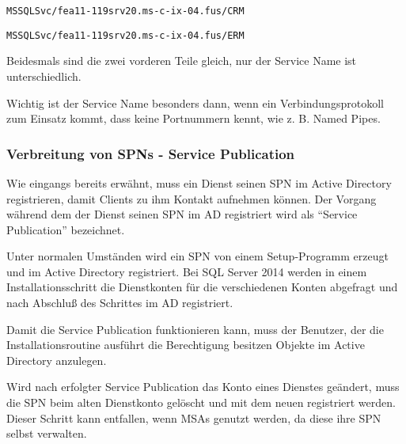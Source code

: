          \texttt{MSSQLSvc/fea11-119srv20.ms-c-ix-04.fus/CRM}
          
          \texttt{MSSQLSvc/fea11-119srv20.ms-c-ix-04.fus/ERM}
          
          Beidesmals sind die zwei vorderen Teile gleich, nur der Service
          Name ist unterschiedlich.
          \begin{merke}
            Wichtig ist der Service Name besonders dann, wenn ein
            Verbindungsprotokoll zum Einsatz kommt, dass keine Portnummern kennt,
            wie z. B. Named Pipes.
          \end{merke}
          \begin{literaturinternet}
            \item \cite{ms677601}
            \item \cite{qzaidi20101012}
          \end{literaturinternet}
        \subsubsection{Verbreitung von SPNs - Service Publication}
          Wie eingangs bereits erwähnt, muss ein Dienst seinen SPN im Active
          Directory registrieren, damit Clients zu ihm Kontakt aufnehmen können.
          Der Vorgang während dem der Dienst seinen SPN im AD registriert wird
          als \enquote{Service Publication} bezeichnet.

          Unter normalen Umständen wird ein SPN von einem Setup-Programm erzeugt
          und im Active Directory registriert. Bei SQL Server 2014 werden in einem
          Installationsschritt die Dienstkonten für die verschiedenen Konten
          abgefragt und nach Abschluß des Schrittes im AD registriert.
          \begin{merke}
            Damit die Service Publication funktionieren kann, muss der Benutzer,
            der die Installationsroutine ausführt die Berechtigung besitzen
            Objekte im Active Directory anzulegen.
          \end{merke}
          Wird nach erfolgter Service Publication das Konto eines Dienstes
          geändert, muss die SPN beim alten Dienstkonto gelöscht und mit dem neuen
          registriert werden. Dieser Schritt kann entfallen, wenn MSAs genutzt
          werden, da diese ihre SPN selbst verwalten.
